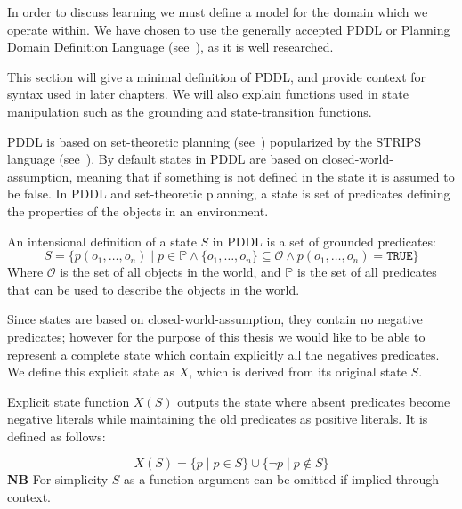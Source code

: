 \documentclass[../Master.tex]{subfiles}
\begin{document}
In order to discuss learning we must define a model for the domain which we operate within. We have chosen to use the generally accepted PDDL or Planning Domain Definition Language (see~\cite{PDDL}), as it is well researched.

This section will give a minimal definition of PDDL, and provide context for syntax used in later chapters. We will also explain functions used in state manipulation such as the grounding and state-transition functions.


PDDL is based on set-theoretic planning (see~\cite{ghallab2004a}) popularized by the STRIPS language (see~\cite{STRIPS}). By default states in PDDL are based on closed-world-assumption, meaning that if something is not defined in the state it is assumed to be false. 
In PDDL and set-theoretic planning, a state is set of predicates defining the properties of the objects in an environment.

\begin{definition} 
	An intensional definition of a state $S$ in PDDL is a set of grounded predicates:
    \begin{equation*}
        S=\{p(o_1,\dots,o_n) \mid  p \in \mathbb{P} \land \{o_1,\dots,o_n\} \subseteq \mathcal{O} \land p(o_1,\dots,o_n) = \texttt{TRUE}\}
    \end{equation*}
    Where $\mathcal{O}$ is the set of all objects in the world, and $\mathbb{P}$ is the set of all predicates that can be used to describe the objects in the world.
\end{definition}

Since states are based on closed-world-assumption, they contain no negative predicates; however for the purpose of this thesis we would like to be able to represent a complete state which contain explicitly all the negatives predicates. 
We define this explicit state as $X$, which is derived from its original state $S$.
\begin{definition} 
	Explicit state function $X(S)$ outputs the state where absent predicates become negative literals while maintaining the old predicates as positive literals. It is defined as follows: 
	
	\begin{equation*}
	X(S)=\{p \mid p \in S \} \cup \{\neg p \mid  p \notin S \}
	\end{equation*}
	\textbf{NB} For simplicity $S$ as a function argument can be omitted if implied through context. 
\end{definition}
\end{document}
